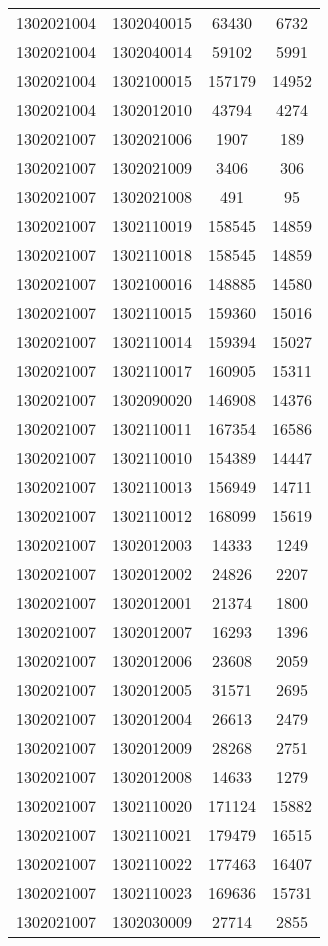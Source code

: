 \begin{longtable}{llcc}
1302021004 & 1302040015 & 63430 & 6732\\
1302021004 & 1302040014 & 59102 & 5991\\
1302021004 & 1302100015 & 157179 & 14952\\
1302021004 & 1302012010 & 43794 & 4274\\
1302021007 & 1302021006 & 1907 & 189\\
1302021007 & 1302021009 & 3406 & 306\\
1302021007 & 1302021008 & 491 & 95\\
1302021007 & 1302110019 & 158545 & 14859\\
1302021007 & 1302110018 & 158545 & 14859\\
1302021007 & 1302100016 & 148885 & 14580\\
1302021007 & 1302110015 & 159360 & 15016\\
1302021007 & 1302110014 & 159394 & 15027\\
1302021007 & 1302110017 & 160905 & 15311\\
1302021007 & 1302090020 & 146908 & 14376\\
1302021007 & 1302110011 & 167354 & 16586\\
1302021007 & 1302110010 & 154389 & 14447\\
1302021007 & 1302110013 & 156949 & 14711\\
1302021007 & 1302110012 & 168099 & 15619\\
1302021007 & 1302012003 & 14333 & 1249\\
1302021007 & 1302012002 & 24826 & 2207\\
1302021007 & 1302012001 & 21374 & 1800\\
1302021007 & 1302012007 & 16293 & 1396\\
1302021007 & 1302012006 & 23608 & 2059\\
1302021007 & 1302012005 & 31571 & 2695\\
1302021007 & 1302012004 & 26613 & 2479\\
1302021007 & 1302012009 & 28268 & 2751\\
1302021007 & 1302012008 & 14633 & 1279\\
1302021007 & 1302110020 & 171124 & 15882\\
1302021007 & 1302110021 & 179479 & 16515\\
1302021007 & 1302110022 & 177463 & 16407\\
1302021007 & 1302110023 & 169636 & 15731\\
1302021007 & 1302030009 & 27714 & 2855\\

\end{longtable}
